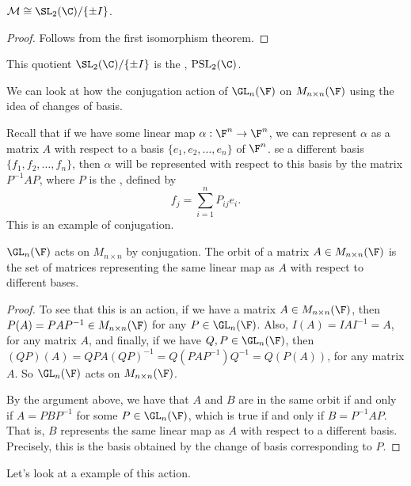 \begin{corollary}
	$\mathcal{M} \cong \SL_2(\C) / \{\pm I\}$.
\end{corollary}
\begin{proof}
	Follows from the first isomorphism theorem.
\end{proof}

This quotient $\SL_2(\C) / \{\pm I\}$ is the , $\operatorname{PSL}_2(\C)$.



We can look at how the conjugation action of $\GL_{n} (\F)$ on $M_{n \times n}(\F)$ using the idea of changes of basis.

Recall that if we have some linear map $\alpha : \F^n \rightarrow \F^n$, we can represent $\alpha$ as a matrix $A$ with respect to a basis $\{e_1, e_2, \dots, e_n\}$ of $\F^n$.
se a different basis $\{f_1, f_2, \dots, f_n\}$, then $\alpha$ will be represented with respect to this basis by the matrix $P^{-1} A P$, where $P$ is the , defined by
$$
	f_j = \sum_{i = 1}^n P_{ij} e_i.
$$
This is an example of conjugation.

\begin{proposition}
	$\GL_n(\F)$ acts on $M_{n \times n}$ by conjugation. The orbit of a matrix $A \in M_{n \times n}(\F)$ is the set of matrices representing the same linear map as $A$ with respect to different bases.
\end{proposition}
\begin{proof}
	To see that this is an action, if we have a matrix $A \in M_{n \times n}(\F)$, then $P(A) = PAP^{-1} \in M_{n \times n}(\F)$ for any $P \in \GL_n(\F)$.
	Also, $I(A) = IAI^{-1} = A$, for any matrix $A$, and finally, if we have $Q, P \in \GL_n(\F)$, then $(QP)(A) = QPA (QP)^{-1} = Q(PAP^{-1})Q^{-1} = Q(P(A))$, for any matrix $A$.
	So $\GL_n(\F)$ acts on $M_{n \times n}(\F)$.

	By the argument above, we have that $A$ and $B$ are in the same orbit if and only if $A = PBP^{-1}$ for some $P \in \GL_n(\F)$, which is true if and only if $B = P^{-1}AP$.
	That is, $B$ represents the same linear map as $A$ with respect to a different basis. Precisely, this is the basis obtained by the change of basis corresponding to $P$.
\end{proof}

Let's look at a example of this action.

